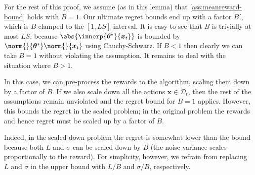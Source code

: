 \documentclass{article}
\renewcommand{\vec}[1]{\bm{#1}}
\DeclarePairedDelimiter{\abs}||
\newcommand{\D}{\mathcal{D}}
\begin{document}
\begin{remark}%
  \label{remark:meanreward-bound}
  For the rest of this proof, we assume (as in this lemma) that
  \cref{ass:meanreward-bound} holds with $B=1$.  Our ultimate regret
  bounds end up with a factor $B'$, which is $B$ clamped to the
  $[1, LS]$ interval.  It is easy to see that $B$ is trivially at most
  $LS$, because $\abs{\innerp{\vec\theta^*}{\vec x_t}}$ is bounded by
  $\norm{}{\vec\theta^*}\norm{}{\vec x_t}$ using Cauchy-Schwarz.  If
  $B<1$ then clearly we can take $B=1$ without violating the
  assumption.  It remains to deal with the situation where $B>1$.

  In this case, we can pre-process the rewards to the algorithm,
  scaling them down by a factor of $B$.  If we also scale down all the
  actions $\vec x\in\D_t$, then the rest of the assumptions remain
  unviolated and the regret bound for $B=1$ applies.  However, this
  bounds the regret in the scaled problem; in the original problem the
  rewards and hence regret must be scaled up by a factor of $B$.

  Indeed, in the scaled-down problem the regret is somewhat lower than
  the bound because both $L$ and $\sigma$ can be scaled down by $B$
  (the noise variance scales proportionally to the reward).  For
  simplicity, however, we refrain from replacing $L$ and $\sigma$ in
  the upper bound with $L/B$ and $\sigma/B$, respectively.
\end{remark}
\end{document}
